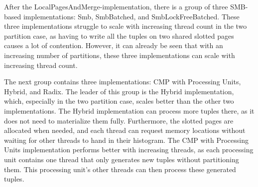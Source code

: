 After the Local\-Pages\-And\-Merge-implementation, there is a group of three \acf{SMB}-based implementations: Smb, Smb\-Batched, and Smb\-Lock\-Free\-Batched.
These three implementations struggle to scale with increasing thread count in the two partition case, as having to write all the tuples on two shared slotted pages causes a lot of contention.
However, it can already be seen that with an increasing number of partitions, these three implementations can scale with increasing thread count.

The next group contains three implementations: \acf{CMP} with Processing Units, Hybrid, and Radix.
The leader of this group is the Hybrid implementation, which, especially in the two partition case, scales better than the other two implementations.
The Hybrid implementation can process more tuples there, as it does not need to materialize them fully.
Furthermore, the slotted pages are allocated when needed, and each thread can request memory locations without waiting for other threads to hand in their histogram.
The \ac{CMP} with Processing Units implementation performs better with increasing threads, as each processing unit contains one thread that only generates new tuples without partitioning them.
This processing unit's other threads can then process these generated tuples.

